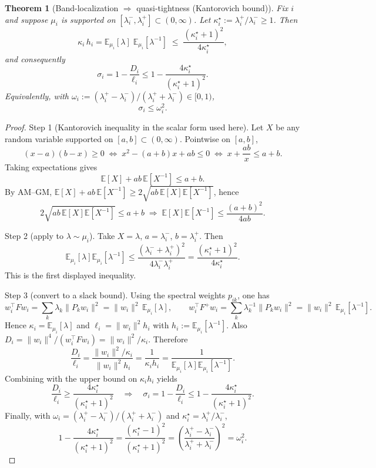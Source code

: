 \documentclass{article}
\theoremstyle{plain}
\newtheorem{theorem}{Theorem}
\numberwithin{equation}{section}
\theoremstyle{definition}
\theoremstyle{remark}
\begin{document}
\begin{lemmaproofbox}
\begin{theorem}[Band-localization $\Rightarrow$ quasi-tightness (Kantorovich bound)]\label{thm:kantorovich-band}
Fix $i$ and suppose $\mu_i$ is supported on $[\lambda_i^{-},\lambda_i^{+}]\subset(0,\infty)$.
Let $\kappa_i^\star:=\lambda_i^{+}/\lambda_i^{-}\ge 1$.
Then
\[
\kappa_i\,h_i
=
\mathbb{E}_{\mu_i}[\lambda]\;\mathbb{E}_{\mu_i}[\lambda^{-1}]
\;\le\;
\frac{(\kappa_i^{\star}+1)^2}{4\kappa_i^{\star}},
\]
and consequently
\[
\sigma_i
=
1-\frac{D_i}{\ell_i}
\le
1-\frac{4\kappa_i^{\star}}{(\kappa_i^{\star}+1)^2}.
\]
Equivalently, with $\omega_i := (\lambda_i^{+}-\lambda_i^{-})/(\lambda_i^{+}+\lambda_i^{-})\in[0,1)$,
\[
\sigma_i \le \omega_i^2.
\]
\end{theorem}

\begin{proof}
Step 1 (Kantorovich inequality in the scalar form used here).
Let $X$ be any random variable supported on $[a,b]\subset(0,\infty)$. Pointwise on $[a,b]$,
\[
(x-a)(b-x)\ge 0
\;\Longleftrightarrow\;
x^2-(a+b)x+ab\le 0
\;\Longleftrightarrow\;
x+\frac{ab}{x}\le a+b.
\]
Taking expectations gives
\[
\mathbb{E}[X] + ab\,\mathbb{E}[X^{-1}] \le a+b.
\]
By AM--GM, $\mathbb{E}[X] + ab\,\mathbb{E}[X^{-1}] \ge 2\sqrt{ab\,\mathbb{E}[X]\mathbb{E}[X^{-1}]}$, hence
\[
2\sqrt{ab\,\mathbb{E}[X]\mathbb{E}[X^{-1}]}\le a+b
\;\Longrightarrow\;
\mathbb{E}[X]\mathbb{E}[X^{-1}] \le \frac{(a+b)^2}{4ab}.
\]

Step 2 (apply to $\lambda\sim\mu_i$).
Take $X=\lambda$, $a=\lambda_i^-$, $b=\lambda_i^+$. Then
\[
\mathbb{E}_{\mu_i}[\lambda]\mathbb{E}_{\mu_i}[\lambda^{-1}]
\le
\frac{(\lambda_i^-+\lambda_i^+)^2}{4\lambda_i^-\lambda_i^+}
=
\frac{(\kappa_i^\star+1)^2}{4\kappa_i^\star}.
\]
This is the first displayed inequality.

Step 3 (convert to a slack bound).
Using the spectral weights $p_{ik}$, one has
\[
w_i^\top F w_i = \sum_k \lambda_k \|P_k w_i\|^2 = \|w_i\|^2\,\mathbb{E}_{\mu_i}[\lambda],
\qquad
w_i^\top F^+ w_i = \sum_k \lambda_k^{-1} \|P_k w_i\|^2 = \|w_i\|^2\,\mathbb{E}_{\mu_i}[\lambda^{-1}].
\]
Hence $\kappa_i=\mathbb{E}_{\mu_i}[\lambda]$ and $\ell_i=\|w_i\|^2 h_i$ with $h_i:=\mathbb{E}_{\mu_i}[\lambda^{-1}]$.
Also $D_i = \|w_i\|^4/(w_i^\top F w_i) = \|w_i\|^2/\kappa_i$. Therefore
\[
\frac{D_i}{\ell_i}
=
\frac{\|w_i\|^2/\kappa_i}{\|w_i\|^2 h_i}
=
\frac{1}{\kappa_i h_i}
=
\frac{1}{\mathbb{E}_{\mu_i}[\lambda]\mathbb{E}_{\mu_i}[\lambda^{-1}]}.
\]
Combining with the upper bound on $\kappa_i h_i$ yields
\[
\frac{D_i}{\ell_i}
\ge
\frac{4\kappa_i^\star}{(\kappa_i^\star+1)^2}
\quad\Longrightarrow\quad
\sigma_i = 1-\frac{D_i}{\ell_i}
\le
1-\frac{4\kappa_i^\star}{(\kappa_i^\star+1)^2}.
\]
Finally, with $\omega_i=(\lambda_i^+-\lambda_i^-)/(\lambda_i^++\lambda_i^-)$ and $\kappa_i^\star=\lambda_i^+/\lambda_i^-$,
\[
1-\frac{4\kappa_i^\star}{(\kappa_i^\star+1)^2}
=
\frac{(\kappa_i^\star-1)^2}{(\kappa_i^\star+1)^2}
=
\left(\frac{\lambda_i^+-\lambda_i^-}{\lambda_i^++\lambda_i^-}\right)^2
=
\omega_i^2.
\]
\end{proof}
\end{lemmaproofbox}
\end{document}
